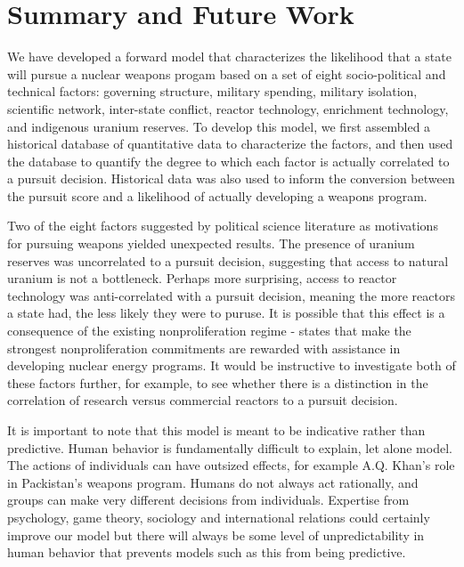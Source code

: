 \section{Summary and Future Work}
\label{s_future}

We have developed a forward model that characterizes the likelihood that a state will pursue a nuclear weapons progam based on a set of eight socio-political and technical factors: governing structure, military spending, military isolation, scientific network, inter-state conflict, reactor technology, enrichment technology, and indigenous uranium reserves. To develop this model, we first assembled a historical database of quantitative data to characterize the factors, and then used the database to quantify the degree to which each factor is actually correlated to a pursuit decision. Historical data was also used to inform the conversion between the pursuit score and a likelihood of actually developing a weapons program. 

Two of the eight factors suggested by political science literature as motivations for pursuing weapons yielded unexpected results. The presence of uranium reserves was uncorrelated to a pursuit decision, suggesting that access to natural uranium is not a bottleneck.  Perhaps more surprising, access to reactor technology was anti-correlated with a pursuit decision, meaning the more reactors a state had, the less likely they were to puruse. It is possible that this effect is a consequence of the existing nonproliferation regime - states that make the strongest nonproliferation commitments are rewarded with assistance in developing nuclear energy programs.  It would be instructive to investigate both of these factors further, for example, to see whether there is a distinction in the correlation of research versus commercial reactors to a pursuit decision.

It is important to note that this model is meant to be indicative rather than predictive. Human behavior is fundamentally difficult to explain, let alone model.  The actions of individuals can have outsized effects, for example A.Q. Khan's role in Packistan's weapons program.  Humans do not always act rationally, and groups can make very different decisions from individuals.  Expertise from psychology, game theory, sociology and international relations could certainly improve our model but there will always be some level of unpredictability in human behavior that prevents models such as this from being predictive.

